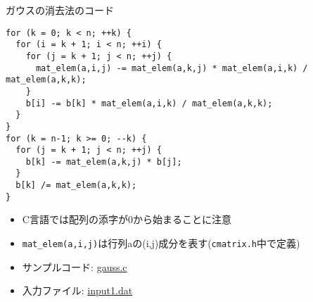 \begin{frame}[t,fragile]{ガウスの消去法のコード}
\begin{lstlisting}
for (k = 0; k < n; ++k) {
  for (i = k + 1; i < n; ++i) {
    for (j = k + 1; j < n; ++j) {
      mat_elem(a,i,j) -= mat_elem(a,k,j) * mat_elem(a,i,k) / mat_elem(a,k,k);
    }
    b[i] -= b[k] * mat_elem(a,i,k) / mat_elem(a,k,k);
  }
}
for (k = n-1; k >= 0; --k) {
  for (j = k + 1; j < n; ++j) {
    b[k] -= mat_elem(a,k,j) * b[j];
  }
  b[k] /= mat_elem(a,k,k);
}
\end{lstlisting}
\begin{itemize}
\item C言語では配列の添字が0から始まることに注意
\item \verb+mat_elem(a,i,j)+は行列aの(i,j)成分を表す({\tt cmatrix.h}中で定義)
\item サンプルコード: \href{https://github.com/todo-group/computer-experiments/blob/master/exercise/linear_system/gauss.c}{gauss.c}
\item 入力ファイル: \href{https://github.com/todo-group/computer-experiments/blob/master/exercise/linear_system/input1.dat}{input1.dat}
\end{itemize}
\end{frame}
